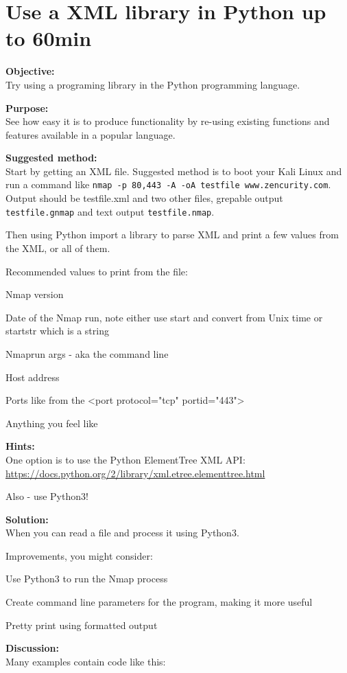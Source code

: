 \documentclass[a4paper,11pt,notitlepage]{report}
\begin{document}
\chapter{Use a XML library in Python up to 60min}
\label{ex-python-library}

{\bf Objective:}\\
Try using a programing library in the Python programming language.

{\bf Purpose:}\\
See how easy it is to produce functionality by re-using existing functions and features available in a popular language.

{\bf Suggested method:}\\
Start by getting an XML file. Suggested method is to boot your Kali Linux and run a command like \verb+nmap -p 80,443 -A -oA testfile www.zencurity.com+. Output should be testfile.xml and two other files, grepable output \verb+testfile.gnmap+ and text output \verb+testfile.nmap+.

Then using Python import a library to parse XML and print a few values from the XML, or all of them.

Recommended values to print from the file:
\begin{list2}
\item Nmap version
\item Date of the Nmap run, note either use start and convert from Unix time or startstr which is a string
\item Nmaprun args - aka the command line
\item Host address
\item Ports like from the <port protocol="tcp" portid="443">
\item Anything you feel like
\end{list2}

{\bf Hints:}\\
One option is to use the Python ElementTree XML API:\\
\url{https://docs.python.org/2/library/xml.etree.elementtree.html}

Also - use Python3!

{\bf Solution:}\\
When you can read a file and process it using Python3.

Improvements, you might consider:
\begin{list2}
\item Use Python3 to run the Nmap process
\item Create command line parameters for the program, making it more useful
\item Pretty print using formatted output
\end{list2}
{\bf Discussion:}\\
Many examples contain code like this:
\end{document}
